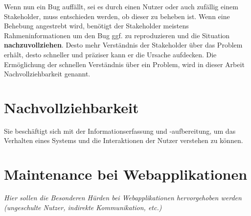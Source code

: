 	Wenn nun ein Bug auffällt, sei es durch einen Nutzer oder auch zufällig einem Stakeholder, muss entschieden werden, ob dieser zu beheben ist. Wenn eine Behebung angestrebt wird, benötigt der Stakeholder meistens Rahmeninformationen \citationneeded um den Bug ggf. zu reproduzieren und die Situation \textbf{nachzuvollziehen}. Desto mehr Verständnis der Stakeholder über das Problem erhält, desto schneller und präziser kann er die Ursache aufdecken. Die Ermöglichung der schnellen Verständnis über ein Problem, wird in dieser Arbeit Nachvollziehbarkeit genannt.

\section{Nachvollziehbarkeit}

	Sie beschäftigt sich mit der Informationserfassung und -aufbereitung, um das Verhalten eines Systems und die Interaktionen der Nutzer verstehen zu können.

\section{Maintenance bei Webapplikationen}

	\textit{Hier sollen die Besonderen Hürden bei Webapplikationen hervorgehoben werden (ungeschulte Nutzer, indirekte Kommunikation, etc.)}